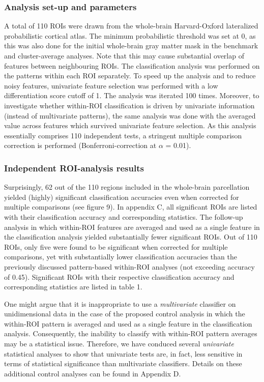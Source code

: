 \documentclass[jou,12pt,a4paper]{apa6}
\begin{document}
\subsubsection{Analysis set-up and parameters}
A total of 110 ROIs were drawn from the whole-brain Harvard-Oxford lateralized probabilistic cortical atlas. The minimum probabilistic threshold was set at 0, as this was also done for the initial whole-brain gray matter mask in the benchmark and cluster-average analyses. Note that this may cause substantial overlap of features between neighbouring ROIs. The classification analysis was performed on the patterns within each ROI separately. To speed up the analysis and to reduce noisy features, univariate feature selection was performed with a low differentiation score cutoff of 1. The analysis was iterated 100 times. Moreover, to investigate whether within-ROI classification is driven by univariate information (instead of multivariate patterns), the same analysis was done with the averaged value across features which survived univariate feature selection. As this analysis essentially comprises 110 independent tests, a stringent multiple comparison correction is performed (Bonferroni-correction at $\alpha$ = 0.01). 

\subsubsection{Independent ROI-analysis results}
Surprisingly, 62 out of the 110 regions included in the whole-brain parcellation yielded (highly) significant classification accuracies even when corrected for multiple comparisons (see figure 9). In appendix C, all significant ROIs are listed with their classification accuracy and corresponding statistics. The follow-up analysis in which within-ROI features are averaged and used as a single feature in the classification analysis yielded substantially fewer significant ROIs. Out of 110 ROIs, only five were found to be significant when corrected for multiple comparisons, yet with substantially lower classification accuracies than the previously discussed pattern-based within-ROI analyses (not exceeding accuracy of 0.45). Significant ROIs with their respective classification accuracy and corresponding statistics are listed in table 1.

One might argue that it is inappropriate to use a \emph{multivariate} classifier on unidimensional data in the case of the proposed control analysis in which the within-ROI pattern is averaged and used as a single feature in the classification analysis. Consequently, the inability to classify with within-ROI pattern averages may be a statistical issue. Therefore, we have conduced several \emph{univariate} statistical analyses to show that univariate tests are, in fact, less sensitive in terms of statistical significance than multivariate classifiers. Details on these additional control analyses can be found in Appendix D.
\end{document}
